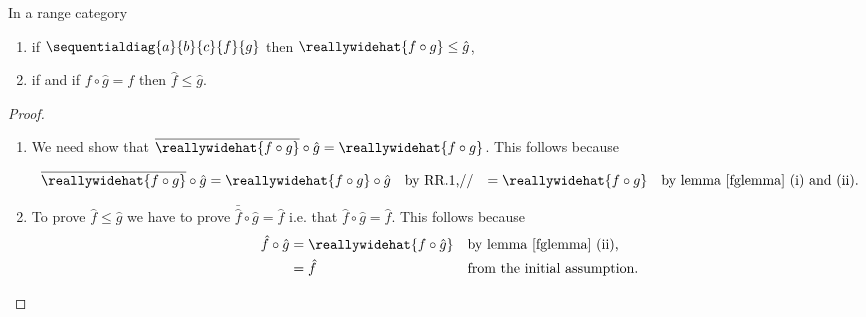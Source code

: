 
\begin{oldtt}
\begin{lemma}
In a range category
\begin{enumerate}
\item if $\sequentialdiag{a}{b}{c}{f}{g}$ 
then $\reallywidehat{f \circ g} \leq \hat{g}$,
\item if \fgsinkdiag and if $f\circ \hat{g} = f$ then
  $\hat{f} \leq \hat{g}$.
\end{enumerate}
\end{lemma}
\begin{proof}
\begin{enumerate}
\item
We need show that 
$\overline{\reallywidehat{f \circ g}} \circ \hat{g} = \reallywidehat{f \circ g}$.
This follows because

\begin{align}
\overline{\reallywidehat{f \circ g}} \circ \hat{g} 
          &= \reallywidehat{f \circ g} \circ \hat{g}  &&\mbox{by RR.1,}//
          &= \reallywidehat{f \circ g} 
                &&\mbox{by lemma \ref{fglemma} (i) and (ii).}
\end{align}
\item
To prove $\hat{f} \leq \hat{g}$ we have to prove 
$\bar{\hat{f}} \circ \hat{g} = \hat{f}$ 
i.e. that $\hat{f} \circ \hat{g} = \hat{f}$. 
This follows because   
\begin{align*}
\hat{f} \circ \hat{g} 
     &= \reallywidehat{f \circ \hat{g}}
                  &&\mbox{by lemma \ref{fglemma} (ii),} \\
     &= \hat{f}   && \mbox{from the initial assumption.}
\end{align*}
\end{enumerate} 
\end{proof}
\end{oldtt}
